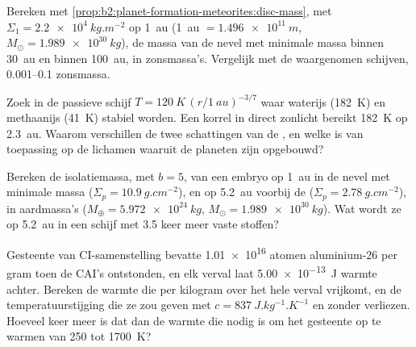 \begin{exercise}[$\star\star$]\label{exo:b2:planet-formation-meteorites:5}
Bereken met \cref{prop:b2:planet-formation-meteorites:disc-mass}, met
$\Sigma_1 = \qty{2.2e4}{kg.m^{-2}}$ op \qty{1}{au} (\qty{1}{au} $=
\qty{1.496e11}{m}$, $M_\odot = \qty{1.989e30}{kg}$), de massa van de
nevel met minimale massa binnen \qty{30}{au} en binnen \qty{100}{au}, in zonsmassa's.
Vergelijk met de waargenomen schijven, \numrange{0.001}{0.1} zonsmassa.
\end{exercise}

\begin{exercise}[$\star\star$]\label{exo:b2:planet-formation-meteorites:6}
Zoek in de passieve schijf $T = \qty{120}{K}\,(r/\qty{1}{au})^{-3/7}$ waar waterijs
(\qty{182}{K}) en methaanijs (\qty{41}{K}) stabiel worden. Een korrel in direct
zonlicht bereikt \qty{182}{K} op \qty{2.3}{au}. Waarom verschillen de twee schattingen van de
, en welke is van toepassing op de lichamen waaruit de planeten zijn opgebouwd?
\end{exercise}

\begin{exercise}[$\star\star$]\label{exo:b2:planet-formation-meteorites:7}
Bereken de isolatiemassa, met $b = 5$, van een embryo op \qty{1}{au} in de
nevel met minimale massa ($\Sigma_p = \qty{10.9}{g.cm^{-2}}$), en op \qty{5.2}{au}
voorbij de  ($\Sigma_p = \qty{2.78}{g.cm^{-2}}$), in aardmassa's
($M_\oplus = \qty{5.972e24}{kg}$, $M_\odot = \qty{1.989e30}{kg}$). Wat wordt ze
op \qty{5.2}{au} in een schijf met \num{3.5} keer meer vaste stoffen?
\end{exercise}

\begin{exercise}[$\star\star$]\label{exo:b2:planet-formation-meteorites:8}
Gesteente van CI-samenstelling bevatte \num{1.01e16} atomen aluminium-26 per gram toen
de CAI's ontstonden, en elk verval laat \qty{5.00e-13}{J} warmte achter. Bereken de
warmte die per kilogram over het hele verval vrijkomt, en de temperatuurstijging die ze
zou geven met $c = \qty{837}{J.kg^{-1}.K^{-1}}$ en zonder verliezen. Hoeveel keer
meer is dat dan de warmte die nodig is om het gesteente op te warmen van \num{250} tot
\qty{1700}{K}?
\end{exercise}


